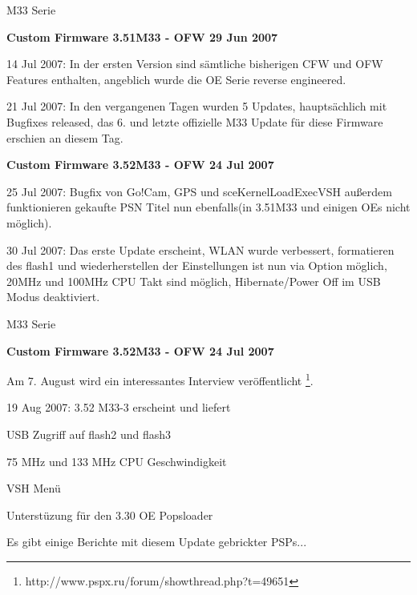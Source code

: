 \documentclass[mode=print,paper=screen,size=10pt,style=paintings]{powerdot}
\begin{document}
\begin{slide}{M33 Serie}
	\begin{large}\textbf{Custom Firmware 3.51M33 - OFW 29 Jun 2007}\end{large}
	\begin{list}{-}{}
		\item{14 Jul 2007: In der ersten Version sind sämtliche bisherigen CFW und OFW Features enthalten, angeblich
			wurde die OE Serie reverse engineered.}
		\item{21 Jul 2007: In den vergangenen Tagen wurden 5 Updates, hauptsächlich mit Bugfixes released, das 6. und letzte
			offizielle M33 Update für diese Firmware erschien an diesem Tag.}
	\end{list}
	\begin{large}\textbf{Custom Firmware 3.52M33 - OFW 24 Jul 2007}\end{large}
	\begin{list}{-}{}
		\item{25 Jul 2007: Bugfix von Go!Cam, GPS und sceKernelLoadExecVSH außerdem funktionieren gekaufte PSN Titel nun 
			ebenfalls(in 3.51M33 und einigen OEs nicht möglich).}
		\item{30 Jul 2007: Das erste Update erscheint, WLAN wurde verbessert, formatieren des flash1 und wiederherstellen der
			Einstellungen ist nun via Option möglich, 20MHz und 100MHz CPU Takt sind möglich, Hibernate/Power Off im USB Modus 
			deaktiviert.}
	\end{list}
\end{slide}

\begin{slide}{M33 Serie}
	\begin{large}\textbf{Custom Firmware 3.52M33 - OFW 24 Jul 2007}\end{large}
	\begin{list}{-}{}
		\item{Am 7. August wird ein interessantes Interview veröffentlicht 	
			\footnote{http://www.pspx.ru/forum/showthread.php?t=49651}.}
		\item{19 Aug 2007: 3.52 M33-3 erscheint und liefert\begin{list}{*}{}
				\item{USB Zugriff auf flash2 und flash3}
				\item{75 MHz und 133 MHz CPU Geschwindigkeit}
				\item{VSH Menü}
				\item{Unterstüzung für den 3.30 OE Popsloader}
			\end{list}}
	\end{list}
	Es gibt einige Berichte mit diesem Update gebrickter PSPs...
\end{slide}
\end{document}
